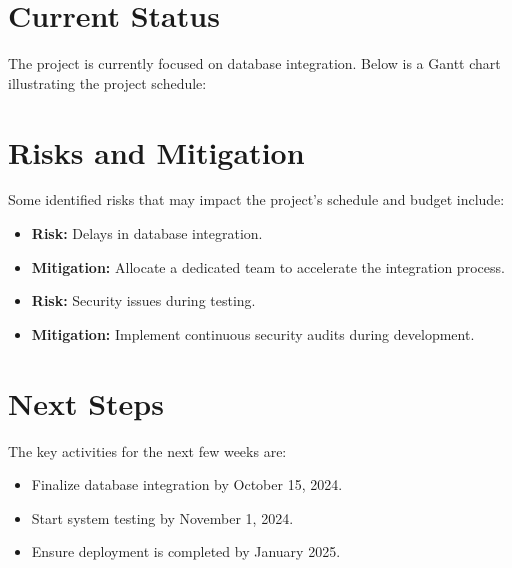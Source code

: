 \documentclass[12pt]{article}
\begin{document}
\section*{Current Status}
The project is currently focused on database integration. Below is a Gantt chart illustrating the project schedule:

\begin{center}
\end{center}

\section*{Risks and Mitigation}
Some identified risks that may impact the project’s schedule and budget include:
\begin{itemize}
    \item \textbf{Risk:} Delays in database integration.
    \item \textbf{Mitigation:} Allocate a dedicated team to accelerate the integration process.
    \item \textbf{Risk:} Security issues during testing.
    \item \textbf{Mitigation:} Implement continuous security audits during development.
\end{itemize}

\section*{Next Steps}
The key activities for the next few weeks are:
\begin{itemize}
    \item Finalize database integration by October 15, 2024.
    \item Start system testing by November 1, 2024.
    \item Ensure deployment is completed by January 2025.
\end{itemize}
\end{document}
